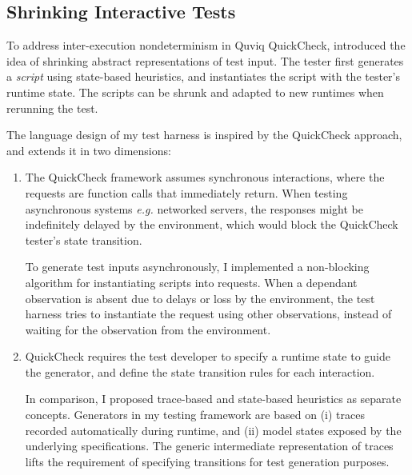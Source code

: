 \subsection{Shrinking Interactive Tests}
\label{sec:related-shrink}

To address inter-execution nondeterminism in Quviq QuickCheck,
\citet{Hughes2016} introduced the idea of shrinking abstract representations of
test input.  The tester first generates a {\em script} using state-based
heuristics, and instantiates the script with the tester's runtime state.  The
scripts can be shrunk and adapted to new runtimes when rerunning the test.

The language design of my test harness is inspired by the QuickCheck approach,
and extends it in two dimensions:
\begin{enumerate}
\item The QuickCheck framework assumes synchronous interactions, where the
  requests are function calls that immediately return.  When testing
  asynchronous systems {\it e.g.} networked servers, the responses might be
  indefinitely delayed by the environment, which would block the QuickCheck
  tester's state transition.
  
  To generate test inputs asynchronously, I implemented a non-blocking algorithm
  for instantiating scripts into requests.  When a dependant observation is
  absent due to delays or loss by the environment, the test harness tries to
  instantiate the request using other observations, instead of waiting for the
  observation from the environment.

\item QuickCheck requires the test developer to specify a runtime state to guide
  the generator, and define the state transition rules for each interaction.

  In comparison, I proposed trace-based and state-based heuristics as separate
  concepts.  Generators in my testing framework are based on (i) traces recorded
  automatically during runtime, and (ii) model states exposed by the underlying
  specifications.  The generic intermediate representation of traces lifts the
  requirement of specifying transitions for test generation purposes.
\end{enumerate}
